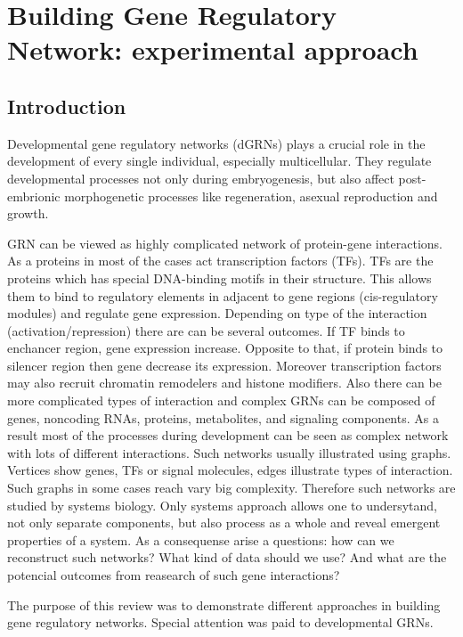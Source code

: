 \documentclass[a4paper, oneside]{report}
\begin{document}
	\setlength{\arrayrulewidth}{0.5mm}
	\setlength{\tabcolsep}{18pt}
	\renewcommand{\arraystretch}{1.5}
\chapter*{Building Gene Regulatory Network: experimental approach}
\section*{Introduction}

Developmental gene regulatory networks (dGRNs) plays a crucial role in the development of every single individual, especially multicellular. 
They regulate developmental processes not only during embryogenesis, but also affect post-embrionic morphogenetic processes like regeneration, asexual reproduction and growth.

GRN can be viewed as highly complicated network of protein-gene interactions. 
As a proteins in most of the cases act transcription factors (TFs). 
TFs are the proteins which has special DNA-binding motifs in their structure. 
This allows them to bind to regulatory elements in adjacent to gene regions (cis-regulatory modules) and regulate gene expression.
Depending on type of the interaction (activation/repression) there are can be several outcomes.
If TF binds to enchancer region, gene expression increase.
Opposite to that, if protein binds to silencer region then gene decrease its expression.
Moreover transcription factors may also recruit chromatin remodelers and histone modifiers.
Also there can be more complicated types of interaction and complex GRNs can be composed of genes, noncoding RNAs, proteins, metabolites, and signaling components. 
As a result most of the processes during development can be seen as complex network with lots of different interactions.
Such networks usually illustrated using graphs.  
Vertices show genes, TFs or signal molecules, edges illustrate types of interaction.
Such graphs in some cases reach vary big complexity.
Therefore such networks are studied by systems biology.
Only systems approach allows one to undersytand, not only separate components, but also process as a whole and reveal emergent properties of a system.  
As a consequense arise a questions: how can we reconstruct such networks? 
What kind of data should we use? 
And what are the potencial outcomes from reasearch of such gene interactions?

The purpose of this review was to demonstrate different approaches in building gene regulatory networks.
Special attention was paid to developmental GRNs.  
\end{document}
